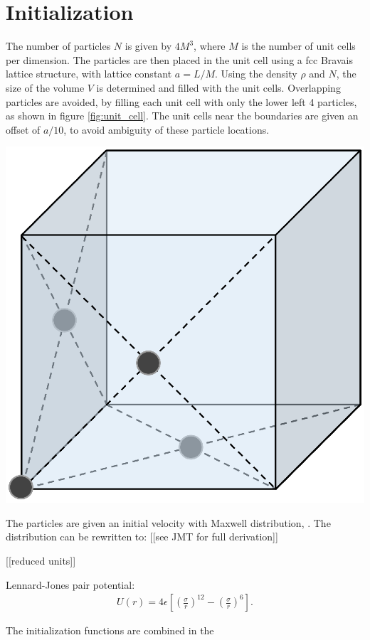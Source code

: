 \section{Initialization}
The number of particles $N$ is given by $4M^3$, where $M$ is the number of unit cells per dimension. The particles are then placed in the unit cell using a fcc Bravais lattice structure, with lattice constant $a=L/M$. Using the density $\rho$ and $N$, the size of the volume $V$ is determined and filled with the unit cells. Overlapping particles are avoided, by filling each unit cell with only the lower left 4 particles, as shown in figure \ref{fig:unit_cell}. The unit cells near the boundaries are given an offset of $a/10$, to avoid ambiguity of these particle locations.
\begin{Figure}
 \centering
 \includegraphics[width=0.35\linewidth]{fcc_cell.eps}
 \label{fig:unit_cell}
\end{Figure}

The particles are given an initial velocity with Maxwell distribution, $ $. The distribution can be rewritten to: [[see JMT for full derivation]]

[[reduced units]]

Lennard-Jones pair potential:
\begin{gather*} 
    U(r) = 4\epsilon\left[\left(\frac{\sigma}{r}\right)^{12}-\left(\frac{\sigma}{r}\right)^6\right].
\end{gather*}

The initialization functions are combined in the 